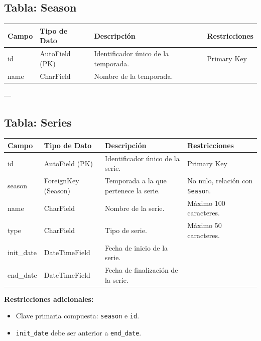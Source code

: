 \documentclass{report}
\begin{document}
    \subsection*{Tabla: Season}
    \begin{tabular}{|>{\raggedright\arraybackslash}p{3cm}|>{\raggedright\arraybackslash}p{3cm}|>{\raggedright\arraybackslash}p{6cm}|>{\raggedright\arraybackslash}p{4cm}|}
        \hline
        \textbf{Campo} & \textbf{Tipo de Dato} & \textbf{Descripción} & \textbf{Restricciones} \\
        \hline
        id & AutoField (PK) & Identificador único de la temporada. & Primary Key \\
        \hline
        name & CharField & Nombre de la temporada. &  \\
        \hline
    \end{tabular}
    
    ---
    
    \subsection*{Tabla: Series}
    \begin{tabular}{|>{\raggedright\arraybackslash}p{3cm}|>{\raggedright\arraybackslash}p{3cm}|>{\raggedright\arraybackslash}p{6cm}|>{\raggedright\arraybackslash}p{4cm}|}
        \hline
        \textbf{Campo} & \textbf{Tipo de Dato} & \textbf{Descripción} & \textbf{Restricciones} \\
        \hline
        id & AutoField (PK) & Identificador único de la serie. & Primary Key \\
        \hline
        season & ForeignKey (Season) & Temporada a la que pertenece la serie. & No nulo, relación con \texttt{Season}. \\
        \hline
        name & CharField & Nombre de la serie. & Máximo 100 caracteres. \\
        \hline
        type & CharField & Tipo de serie. & Máximo 50 caracteres. \\
        \hline
        init\_date & DateTimeField & Fecha de inicio de la serie. &  \\
        \hline
        end\_date & DateTimeField & Fecha de finalización de la serie. &  \\
        \hline
    \end{tabular}
    
    \textbf{Restricciones adicionales:}
    \begin{itemize}
        \item Clave primaria compuesta: \texttt{season} e \texttt{id}.
        \item \texttt{init\_date} debe ser anterior a \texttt{end\_date}.
    \end{itemize}
    
\end{document}
